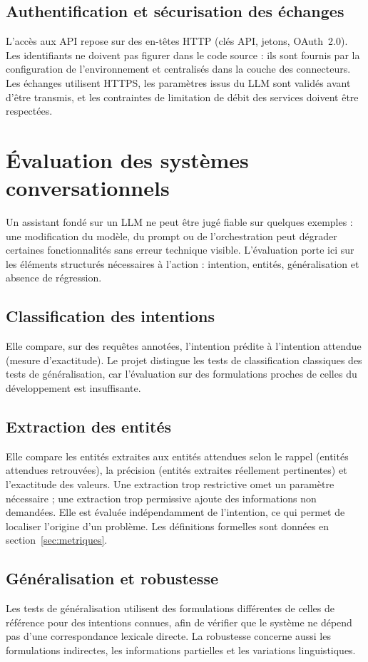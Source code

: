 \documentclass[11pt,a4paper,openany,oneside]{report}
\begin{document}
\subsection{Authentification et sécurisation des échanges}
L'accès aux API repose sur des en-têtes HTTP (clés API, jetons, OAuth~2.0). Les identifiants ne doivent pas figurer dans le code source : ils sont fournis par la configuration de l'environnement et centralisés dans la couche des connecteurs. Les échanges utilisent HTTPS, les paramètres issus du LLM sont validés avant d'être transmis, et les contraintes de limitation de débit des services doivent être respectées.

\section{Évaluation des systèmes conversationnels}
Un assistant fondé sur un LLM ne peut être jugé fiable sur quelques exemples : une modification du modèle, du prompt ou de l'orchestration peut dégrader certaines fonctionnalités sans erreur technique visible. L'évaluation porte ici sur les éléments structurés nécessaires à l'action : intention, entités, généralisation et absence de régression.

\subsection{Classification des intentions}
Elle compare, sur des requêtes annotées, l'intention prédite à l'intention attendue (mesure d'exactitude). Le projet distingue les tests de classification classiques des tests de généralisation, car l'évaluation sur des formulations proches de celles du développement est insuffisante.

\subsection{Extraction des entités}
Elle compare les entités extraites aux entités attendues selon le rappel (entités attendues retrouvées), la précision (entités extraites réellement pertinentes) et l'exactitude des valeurs. Une extraction trop restrictive omet un paramètre nécessaire ; une extraction trop permissive ajoute des informations non demandées. Elle est évaluée indépendamment de l'intention, ce qui permet de localiser l'origine d'un problème. Les définitions formelles sont données en section~\ref{sec:metriques}.

\subsection{Généralisation et robustesse}
Les tests de généralisation utilisent des formulations différentes de celles de référence pour des intentions connues, afin de vérifier que le système ne dépend pas d'une correspondance lexicale directe. La robustesse concerne aussi les formulations indirectes, les informations partielles et les variations linguistiques.
\end{document}

